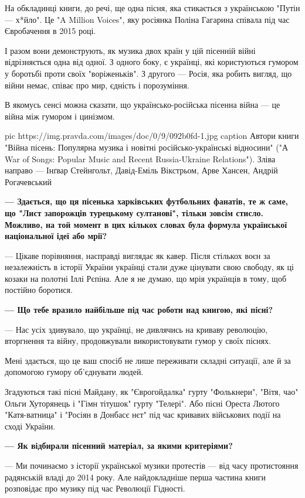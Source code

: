 На обкладинці книги, до речі, ще одна пісня, яка стикається з українською
"Путін — х*йло". Це "A Million Voices", яку росіянка Поліна Гагарина співала
під час Євробачення в 2015 році. 

І разом вони демонструють, як музика двох країн у цій пісенній війні
відрізняється одна від одної. З одного боку, є українці, які користуються
гумором у боротьбі проти своїх "воріженьків". З другого — Росія, яка робить
вигляд, що війни немає, співає про мир, єдність і порозуміння. 

В якомусь сенсі можна сказати, що українсько-російська пісенна війна — це війна
між гумором і цинізмом.

\ifcmt
pic https://img.pravda.com/images/doc/0/9/092b0fd-1.jpg
caption Автори книги "Війна пісень: Популярна музика і новітні російсько-українські відносини" ("А War of Songs: Popular Music and Recent Russia-Ukraine Relations"). Зліва направо — Інґвар Стейнгольт, Давід-Еміль Вікстрьом, Арве Хансен, Андрій Рогачевський
\fi

\textbf{— Здається, що ця пісенька харківських футбольних фанатів, те ж саме, що "Лист запорожців турецькому султанові", тільки зовсім стисло. Можливо, на той момент в цих кількох словах була формула української національної ідеї або мрії?} 

— Цікаве порівняння, насправді виглядає як кавер. Після стількох воєн за
незалежність в історії України українці стали дуже цінувати свою свободу, як ці
козаки на полотні Іллі Рєпіна. Але я не думаю, що мрія українців в тому, щоб
постійно боротися. 

\textbf{— Що тебе вразило найбільше під час роботи над книгою, які пісні?} 

— Нас усіх здивувало, що українці, не дивлячись на криваву революцію,
вторгнення та війну, продовжували використовувати гумор у своїх піснях.

Мені здається, що це ваш спосіб не лише переживати складні ситуації, але й за
допомогою гумору об’єднувати людей. 

Згадуються такі пісні Майдану, як "Єврогойдалка" гурту "Фолькнери", "Вітя, чао"
Ольги Хуторянець і "Гімн тітушок" гурту "Телері". Або пісні Ореста Лютого
"Катя-ватница" і "Росіян в Донбасє нєт" під час кривавих військових події на
сході України.

\textbf{— Як відбирали пісенний матеріал, за якими критеріями?} 

— Ми починаємо з історії української музики протестів — від часу протистояння
радянській владі до 2014 року. Але найдокладніше перша частина книги
розповідає про музику під час Революції Гідності. 

